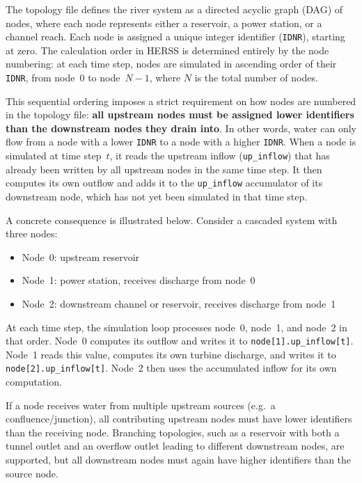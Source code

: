\documentclass[a4paper, 12pt]{report}
\begin{document}
	The topology file defines the river system as a directed acyclic graph (DAG) of nodes, where each node represents either a reservoir, a power station, or a channel reach. Each node is assigned a unique integer identifier (\texttt{IDNR}), starting at zero. The calculation order in HERSS is determined entirely by the node numbering: at each time step, nodes are simulated in ascending order of their \texttt{IDNR}, from node~$0$ to node~$N-1$, where $N$ is the total number of nodes.
	
	This sequential ordering imposes a strict requirement on how nodes are numbered in the topology file: \textbf{all upstream nodes must be assigned lower identifiers than the downstream nodes they drain into}. In other words, water can only flow from a node with a lower \texttt{IDNR} to a node with a higher \texttt{IDNR}. When a node is simulated at time step~$t$, it reads the upstream inflow (\texttt{up\_inflow}) that has already been written by all upstream nodes in the same time step. It then computes its own outflow and adds it to the \texttt{up\_inflow} accumulator of its downstream node, which has not yet been simulated in that time step.
	
	A concrete consequence is illustrated below. Consider a cascaded system with three nodes:
	
	\begin{itemize}
		\item Node~0: upstream reservoir
		\item Node~1: power station, receives discharge from node~0
		\item Node~2: downstream channel or reservoir, receives discharge from node~1
	\end{itemize}
	
	At each time step, the simulation loop processes node~0, node~1, and node~2 in that order. Node~0 computes its outflow and writes it to \texttt{node[1].up\_inflow[t]}. Node~1 reads this value, computes its own turbine discharge, and writes it to \texttt{node[2].up\_inflow[t]}. Node~2 then uses the accumulated inflow for its own computation.

	
	If a node receives water from multiple upstream sources (e.g.\ a confluence/junction), all contributing upstream nodes must have lower identifiers than the receiving node. Branching topologies, such as a reservoir with both a tunnel outlet and an overflow outlet leading to different downstream nodes, are supported, but all downstream nodes must again have higher identifiers than the source node.
	
\end{document}
